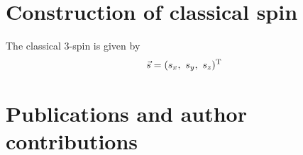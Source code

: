 \section{Construction of classical spin}
\label{sec:cspin}
The classical 3-spin is given by
\begin{align}
    \label{cspin:1}
    \vec{s}=(s_{x},\ s_{y},\ s_{z})^{\rm T}
\end{align}

\section{Publications and author contributions}
\label{sec:pubs}
